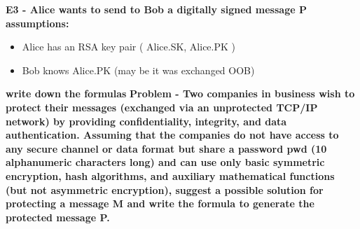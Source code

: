 \textbf{E3 - Alice wants to send to Bob a digitally signed message P}
\textbf{assumptions:}
\begin{itemize}
    \item Alice has an RSA key pair ( Alice.SK, Alice.PK )
    \item Bob knows Alice.PK (may be it was exchanged OOB)
\end{itemize}
\textbf{write down the formulas}
\textbf{Problem - Two companies in business wish to protect their messages
(exchanged via an unprotected TCP/IP network) by
providing confidentiality, integrity, and data authentication.
Assuming that the companies do not have access to any
secure channel or data format but share a password pwd
(10 alphanumeric characters long) and can use only basic
symmetric encryption, hash algorithms, and auxiliary
mathematical functions (but not asymmetric encryption),
suggest a possible solution for protecting a message M and
write the formula to generate the protected message P.\\}

